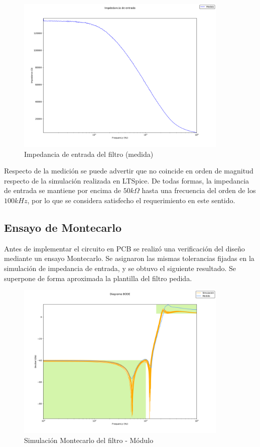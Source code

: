 \begin{figure}[H]
    \centering
    \includegraphics[width=0.9\textwidth]{../EJ3/Resources/zin_medida.png}
    \caption{Impedancia de entrada del filtro (medida)}
     \label{EJ3_ZIN_MEASURED}
\end{figure}

Respecto de la medici\'on se puede advertir que no coincide en orden de magnitud respecto de la simulaci\'on realizada en LTSpice. De todas formas, la impedancia de entrada se mantiene por encima de $50k\Omega$ hasta una frecuencia del orden de los $100kHz$, por lo que se considera satisfecho el requerimiento en este sentido.

\subsection{Ensayo de Montecarlo}

Antes de implementar el circuito en PCB se realiz\'o una verificaci\'on del dise\~no mediante un ensayo Montecarlo. Se asignaron las mismas tolerancias fijadas en la simulaci\'on de impedancia de entrada, y se obtuvo el siguiente resultado. Se superpone de forma aproximada la plantilla del filtro pedida.


\begin{figure}[H]
    \centering
    \includegraphics[width=0.9\textwidth]{../EJ3/Resources/montecarlo_plantilla2.png}
    \caption{Simulaci\'on Montecarlo del filtro - M\'odulo}
     \label{EJ3_FILTER_MONTECARLO}
\end{figure}

